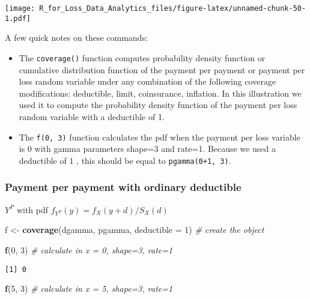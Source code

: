 \documentclass[]{book}
\newenvironment{Shaded}{\begin{snugshade}}{\end{snugshade}}
\newcommand{\KeywordTok}[1]{\textcolor[rgb]{0.13,0.29,0.53}{\textbf{#1}}}
\newcommand{\DataTypeTok}[1]{\textcolor[rgb]{0.13,0.29,0.53}{#1}}
\newcommand{\DecValTok}[1]{\textcolor[rgb]{0.00,0.00,0.81}{#1}}
\newcommand{\StringTok}[1]{\textcolor[rgb]{0.31,0.60,0.02}{#1}}
\newcommand{\CommentTok}[1]{\textcolor[rgb]{0.56,0.35,0.01}{\textit{#1}}}
\newcommand{\NormalTok}[1]{#1}
\providecommand{\tightlist}{%
  \setlength{\itemsep}{0pt}\setlength{\parskip}{0pt}}
\theoremstyle{definition}
\theoremstyle{definition}
\theoremstyle{definition}
\theoremstyle{remark}
\begin{document}
\texttt{[image: R\_for\_Loss\_Data\_Analytics\_files/figure-latex/unnamed-chunk-50-1.pdf]}

A few quick notes on these commands:

\begin{itemize}
\tightlist
\item
  The \texttt{coverage()} function computes probability density function
  or cumulative distribution function of the payment per payment or
  payment per loss random variable under any combination of the
  following coverage modifications: deductible, limit, coinsurance,
  inflation. In this illustration we used it to compute the probability
  density function of the payment per loss random variable with a
  deductible of 1.
\item
  The \texttt{f(0,\ 3)} function calculates the pdf when the payment per
  loss variable is 0 with gamma parameters shape=3 and rate=1. Because
  we used a deductible of 1 , this should be equal to
  \texttt{pgamma(0+1,\ 3)}.
\end{itemize}

\subsubsection{Payment per payment with ordinary
deductible}\label{payment-per-payment-with-ordinary-deductible}

\(Y^P\) with pdf \(f_{Y^P}(y) = f_X(y+d)/S_X(d)\)

\begin{Shaded}
\begin{Highlighting}[]
\NormalTok{f <-}\StringTok{ }\KeywordTok{coverage}\NormalTok{(dgamma, pgamma, }\DataTypeTok{deductible =} \DecValTok{1}\NormalTok{) }\CommentTok{# create the object}

\KeywordTok{f}\NormalTok{(}\DecValTok{0}\NormalTok{, }\DecValTok{3}\NormalTok{) }\CommentTok{# calculate in x = 0, shape=3, rate=1}
\end{Highlighting}
\end{Shaded}

\begin{verbatim}
[1] 0
\end{verbatim}

\begin{Shaded}
\begin{Highlighting}[]
\KeywordTok{f}\NormalTok{(}\DecValTok{5}\NormalTok{, }\DecValTok{3}\NormalTok{) }\CommentTok{# calculate in x = 5, shape=3, rate=1}
\end{Highlighting}
\end{Shaded}
\end{document}
